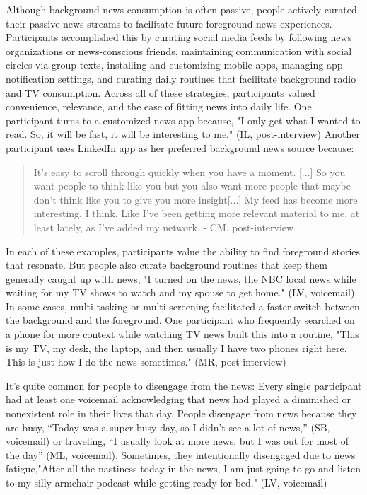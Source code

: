 \documentclass[sigchi]{acmart}
\begin{document}
Although background news consumption is often passive, people actively curated their passive news streams to facilitate future foreground news experiences. Participants accomplished this by curating social media feeds by following news organizations or news-conscious friends, maintaining communication with social circles via group texts, installing and customizing mobile apps, managing app notification settings, and curating daily routines that facilitate background radio and TV consumption. Across all of these strategies, participants valued convenience, relevance, and the ease of fitting news into daily life. One participant turns to a customized news app because, "I only get what I wanted to read. So, it will be fast, it will be interesting to me." (IL, post-interview) Another participant uses LinkedIn app as her preferred background news source because:
\begin{quote}
It's easy to scroll through quickly when you have a moment. [...] So you want people to think like you but you also want more people that maybe don't think like you to give you more insight[...] My feed has become more interesting, I think. Like I've been getting more relevant material to me, at least lately, as I've added my network.  - CM, post-interview\end{quote}

In each of these examples, participants value the ability to find foreground stories that resonate. But people also curate background routines that keep them generally caught up with news, "I turned on the news, the NBC local news while waiting for my TV shows to watch and my spouse to get home." (LV, voicemail) In some cases, multi-tasking or multi-screening facilitated a faster switch between the background and the foreground. One participant who frequently searched on a phone for more context while watching TV news built this into a routine, "This is my TV, my desk, the laptop, and then usually I have two phones right here. This is just how I do the news sometimes." (MR, post-interview)

It’s quite common for people to disengage from the news: Every single participant had at least one voicemail acknowledging that news had played a diminished or nonexistent role in their lives that day. People disengage from news because they are busy, “Today was a super busy day, so I didn’t see a lot of news,” (SB, voicemail) or traveling, “I usually look at more news, but I was out for most of the day” (ML, voicemail). Sometimes, they intentionally disengaged due to news fatigue,"After all the nastiness today in the news, I am just going to go and listen to my silly armchair podcast while getting ready for bed." (LV, voicemail)
 
\end{document}
